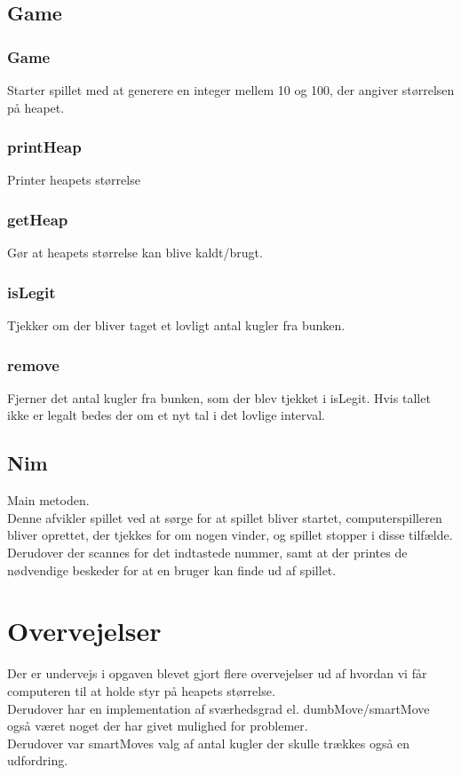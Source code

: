\documentclass[a4paper,11pt]{article}
\begin{document}
\subsection*{Game}
\subsubsection*{Game}
Starter spillet med at generere en integer mellem 10 og 100, der angiver størrelsen på heapet.

\subsubsection*{printHeap}
Printer heapets størrelse

\subsubsection*{getHeap}
Gør at heapets størrelse kan blive kaldt/brugt.

\subsubsection*{isLegit}
Tjekker om der bliver taget et lovligt antal kugler fra bunken.


\subsubsection*{remove}
Fjerner det antal kugler fra bunken, som der blev tjekket i isLegit.
Hvis tallet ikke er legalt bedes der om et nyt tal i det lovlige interval.


\subsection*{Nim}
Main metoden. \\
Denne afvikler spillet ved at sørge for at spillet bliver startet, computerspilleren bliver oprettet, der tjekkes for om nogen vinder, og spillet stopper i disse tilfælde.
Derudover der scannes for det indtastede nummer, samt at der printes de nødvendige beskeder for at en bruger kan finde ud af spillet.

\section*{Overvejelser}
Der er undervejs i opgaven blevet gjort flere overvejelser ud af hvordan vi får computeren til at holde styr på heapets størrelse. \\
Derudover har en implementation af sværhedsgrad el. dumbMove/smartMove også været noget der har givet mulighed for problemer. \\
Derudover var smartMoves valg af antal kugler der skulle trækkes også en udfordring.
\end{document}
